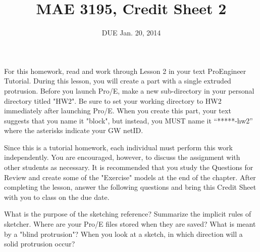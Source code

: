 \documentclass{homework}
\title{MAE 3195, Credit Sheet 2}
\author{DUE Jan. 20, 2014}
\begin{document}
For this homework, read and work through Lesson 2 in your text ProEngineer Tutorial. During this lesson, you will create a part with a single extruded protrusion. Before you launch Pro/E, make a new sub-directory in your personal directory titled "HW2". Be sure to set your working directory to HW2 immediately after launching Pro/E. When you create this part, your text suggests that you name it "block", but instead, you MUST name it “*****-hw2” where the asterisks indicate your GW netID.

Since this is a tutorial homework, each individual must perform this work independently. You are encouraged, however, to discuss the assignment with other students as necessary. It is recommended that you study the Questions for Review and create some of the "Exercise" models at the end of the chapter. After completing the lesson, answer the following questions and bring this Credit Sheet with you to class on the due date.

\problem{} What is the purpose of the sketching reference?
\solution 
\problem{} Summarize the implicit rules of sketcher.
\solution
\problem{} Where are your Pro/E files stored when they are saved?
\solution
\problem{} What is meant by a "blind protrusion"?
\solution
\problem{} When you look at a sketch, in which direction will a solid protrusion occur?
\solution
\end{document}

